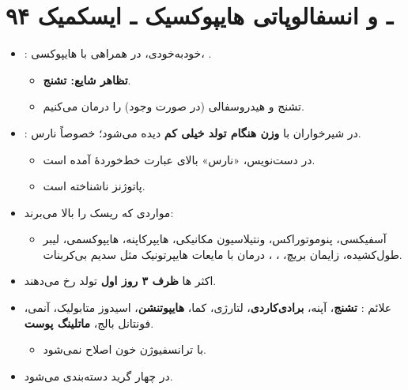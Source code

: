\documentclass[12pt,a4paper]{article}
\begin{document}
\clearpage
\section*{۹۴ ـ  و انسفالوپاتی هایپوکسیک ـ ایسکمیک}
\begin{itemize}
\item {}: خودبه‌خودی، در همراهی با هایپوکسی، .
  \begin{itemize}
  \item \textbf{تظاهر شایع: تشنج}.
  \item تشنج و هیدروسفالی (در صورت وجود) را درمان می‌کنیم.
  \end{itemize}
\item {}: در شیرخواران با \textbf{وزن هنگام تولد خیلی کم} دیده می‌شود؛ خصوصاً نارس.
  \begin{itemize}
  \item در دست‌نویس، «نارس» بالای عبارت خط‌خوردهٔ  آمده است.
  \item پاتوژنز ناشناخته است.
  \end{itemize}
\item مواردی که ریسک  را بالا می‌برند:
  \begin{itemize}
  \item آسفیکسی، پنوموتوراکس، ونتیلاسیون مکانیکی، هایپرکاپنه، هایپوکسمی، لیبر طول‌کشیده، زایمان بریچ، ، ، درمان با مایعات هایپرتونیک مثل سدیم بی‌کربنات.
  \end{itemize}
\item اکثر ها \textbf{ظرف ۳ روز اول} تولد رخ می‌دهند.
\item علائم : \textbf{تشنج}، آپنه، \textbf{برادی‌کاردی}، لتارژی، کما، \textbf{هایپوتنشن}، اسیدوز متابولیک، آنمی، فونتانل بالج، \textbf{ماتلینگ پوست}.
  \begin{itemize}
  \item با ترانسفیوژن خون اصلاح نمی‌شود.
  \end{itemize}
\item {} در چهار گرید دسته‌بندی می‌شود.
\end{itemize}
\end{document}
